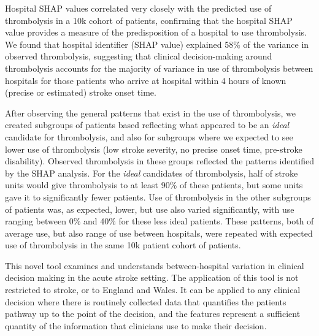 Hospital SHAP values correlated very closely with the predicted use of thrombolysis in a 10k cohort of patients, confirming that the hospital SHAP value provides a measure of the predisposition of a hospital to use thrombolysis. We found that hospital identifier (SHAP value) explained 58\% of the variance in observed thrombolysis, suggesting that clinical decision-making around thrombolysis accounts for the majority of variance in use of thrombolysis between hospitals for those patients who arrive at hospital within 4 hours of known (precise or estimated) stroke onset time. 

After observing the general patterns that exist in the use of thrombolysis, we created subgroups of patients based reflecting what appeared to be an \emph{ideal} candidate for thrombolysis, and also for subgroups where we expected to see lower use of thrombolysis (low stroke severity, no precise onset time, pre-stroke disability). Observed thrombolysis in these groups reflected the patterns identified by the SHAP analysis. For the \emph{ideal} candidates of thrombolysis, half of stroke units would give thrombolysis to at least 90\% of these patients, but some units gave it to significantly fewer patients. Use of thrombolysis in the other subgroups of patients was, as expected, lower, but use also varied significantly, with use ranging between 0\% and 40\% for these less ideal patients. These patterns, both of average use, but also range of use between hospitals, were repeated with expected use of thrombolysis in the same 10k patient cohort of patients.

\iffalse
REFERS TO ARTIFICIAL PATIENTS THAT MAY NOT INCLUDE
Another way of showing variation between units was to use artificial patients. After observing the general patterns that exist in the use of thrombolysis, we created an artificial patient representing an \emph{ideal} candidate for thrombolysis that was predicted to receive thrombolysis at almost every hospital. But when we reduced their stroke severity and attributed an estimated onset time the predicted use of thrombolysis dropped to 35\% of hospitals. With the use of SHAP values it is possible to take the next step into understanding this result by peering into how each hospital responds to the characteristics of this patient, to elucidate where hospitals vary in their attitudes to thrombolysis.
\fi

This novel tool examines and understands between-hospital variation in clinical decision making in the acute stroke setting. The application of this tool is not restricted to stroke, or to England and Wales. It can be applied to any clinical decision where there is routinely collected data that quantifies the patients pathway up to the point of the decision, and the features represent a sufficient quantity of the information that clinicians use to make their decision.

